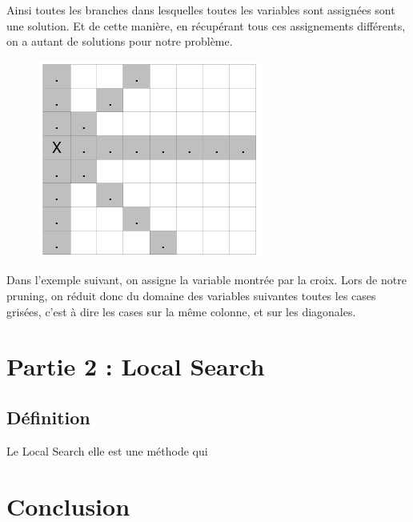 \documentclass{article}
\begin{document}
Ainsi toutes les branches dans lesquelles toutes les variables sont assignées sont une solution. Et de cette manière, en récupérant tous ces assignements différents, on a autant de solutions pour notre problème. 

\begin{figure}[h]

\begin{center}
\includegraphics[scale=0.5]{./picture/pruning1.png}
\end{center}
\label{key}
\end{figure}

Dans l'exemple suivant, on assigne la variable montrée par la croix. Lors de notre pruning, on réduit donc du domaine des variables suivantes toutes les cases grisées, c'est à dire les cases sur la même colonne, et sur les diagonales. 


\vspace{1cm}
\section{Partie 2 : Local Search}
\vspace{2cm}

\subsection {Définition}

Le Local Search elle est une méthode qui 

\subsection {}


\vspace{1cm}
\section{Conclusion}
\vspace{2cm}
\end{document}
